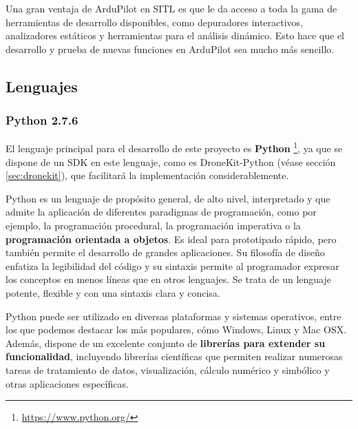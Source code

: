 Una gran ventaja de ArduPilot en SITL es que le da acceso a toda la gama de herramientas de desarrollo disponibles, como depuradores interactivos, analizadores estáticos y herramientas para el análisis dinámico. Esto hace que el desarrollo y prueba de nuevas funciones en ArduPilot sea mucho más sencillo.

\subsection{Lenguajes}
\label{sec:lenguajes}

\subsubsection{Python 2.7.6}
\label{sec:python}

El lenguaje principal para el desarrollo de este proyecto es \textbf{Python} \footnote{\url{https://www.python.org/}}, ya que se dispone de un \acs{SDK} en este lenguaje, como es DroneKit-Python (véase sección \ref{sec:dronekit}), que facilitará la implementación considerablemente.

Python es un lenguaje de propósito general, de alto nivel, interpretado y que admite la aplicación de diferentes paradigmas de programación, como por ejemplo, la programación procedural, la programación imperativa o la \textbf{programación orientada a objetos}. Es ideal para prototipado rápido, pero también permite el desarrollo de grandes aplicaciones. Su filosofía de diseño enfatiza la legibilidad del código y su sintaxis permite al programador expresar los conceptos en menos líneas que en otros lenguajes. Se trata de un lenguaje potente, flexible y con una sintaxis clara y concisa.

Python puede ser utilizado en diversas plataformas y sistemas operativos, entre los que podemos destacar los más populares, cómo Windows, Linux y Mac OSX. Además, dispone de un excelente conjunto de \textbf{librerías para extender su funcionalidad}, incluyendo librerías científicas que permiten realizar numerosas tareas de tratamiento de datos, visualización, cálculo numérico y simbólico y otras aplicaciones específicas.

